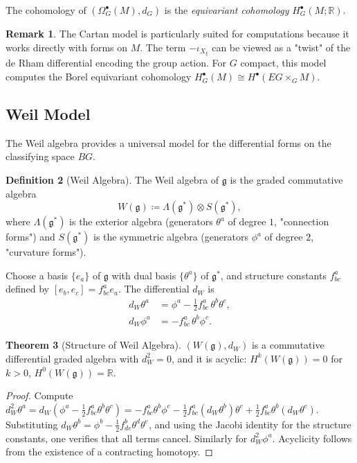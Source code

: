 \documentclass[10pt]{article}
\theoremstyle{definition}
\newtheorem{definition}{Definition}[section]
\newtheorem{theorem}[definition]{Theorem}
\newtheorem{remark}[definition]{Remark}
\newcommand{\cont}[1]{\iota_{#1}}
\newcommand{\R}{\mathbb{R}}
\begin{document}
The cohomology of $(\Omega^{\bullet}_{G}(M), d_G)$ is the \emph{equivariant cohomology} $H^{\bullet}_{G}(M;\R)$.

\begin{remark}
The Cartan model is particularly suited for computations because it works directly with forms on $M$. The term $-\cont{X_{\xi}}$ can be viewed as a "twist" of the de Rham differential encoding the group action. For $G$ compact, this model computes the Borel equivariant cohomology $H^\bullet_G(M) \cong H^\bullet(EG \times_G M)$.
\end{remark}

\subsection{Weil Model}\label{subsec:weil}
The Weil algebra provides a universal model for the differential forms on the classifying space $BG$.

\begin{definition}[Weil Algebra]
The Weil algebra of $\mathfrak{g}$ is the graded commutative algebra
\begin{equation}\label{eq:weil-algebra}
    W(\mathfrak{g}) \coloneqq \Lambda(\mathfrak{g}^{*}) \otimes S(\mathfrak{g}^{*}),
\end{equation}
where $\Lambda(\mathfrak{g}^{*})$ is the exterior algebra (generators $\theta^{a}$ of degree $1$, "connection forms") and $S(\mathfrak{g}^{*})$ is the symmetric algebra (generators $\phi^{a}$ of degree $2$, "curvature forms"). 
\end{definition}

Choose a basis $\{e_a\}$ of $\mathfrak{g}$ with dual basis $\{\theta^{a}\}$ of $\mathfrak{g}^{*}$, and structure constants $f^{a}_{bc}$ defined by $[e_b, e_c] = f^{a}_{bc} e_a$. The differential $d_W$ is
\begin{align}\label{eq:weil-differential}
    d_{W}\theta^{a} &= \phi^{a} - \frac{1}{2} f^{a}_{bc}\, \theta^{b}\theta^{c}, \\
    d_{W}\phi^{a} &= - f^{a}_{bc}\, \theta^{b}\phi^{c}.
\end{align}

\begin{theorem}[Structure of Weil Algebra]
$(W(\mathfrak{g}), d_W)$ is a commutative differential graded algebra with $d_W^2 = 0$, and it is acyclic: $H^k(W(\mathfrak{g})) = 0$ for $k>0$, $H^0(W(\mathfrak{g})) = \R$.
\end{theorem}
\begin{proof}
Compute $d_W^2 \theta^a = d_W (\phi^a - \frac{1}{2} f^a_{bc} \theta^b \theta^c) = - f^a_{bc} \theta^b \phi^c - \frac{1}{2} f^a_{bc} (d_W \theta^b) \theta^c + \frac{1}{2} f^a_{bc} \theta^b (d_W \theta^c)$.
Substituting $d_W \theta^b = \phi^b - \frac{1}{2} f^b_{de} \theta^d \theta^e$, and using the Jacobi identity for the structure constants, one verifies that all terms cancel. Similarly for $d_W^2 \phi^a$. Acyclicity follows from the existence of a contracting homotopy.
\end{proof}
\end{document}
